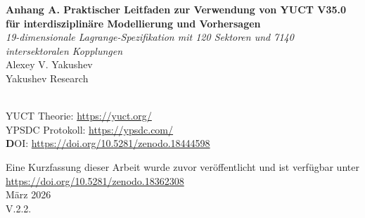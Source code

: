 \documentclass[13pt,a4paper]{article}
\begin{document}
	
	\begin{titlepage}
		\begin{center}
			\vspace*{0.2cm}
			{\Huge\textbf{Anhang A. 
					Praktischer Leitfaden zur Verwendung von YUCT V35.0\\[0.3cm]
					für interdisziplinäre Modellierung und Vorhersagen}}\\[0.8cm]
			
			{\Large\textit{19-dimensionale Lagrange-Spezifikation mit 120 Sektoren und 7140 intersektoralen Kopplungen}}\\[1.2cm]
			
			{\Large Alexey V. Yakushev}\\[0.3cm]
			{\large Yakushev Research}\\\
			
			YUCT Theorie: \url{https://yuct.org/}\\
			YPSDC Protokoll: \url{https://ypsdc.com/}\\
			
			
			\vspace{2cm}
			\textbf DOI: \url{https://doi.org/10.5281/zenodo.18444598}\\
			
			\vspace{1cm}
			
			\vspace{0cm}
			\large 
			Eine Kurzfassung dieser Arbeit wurde zuvor veröffentlicht und ist verfügbar unter\\ \url{https://doi.org/10.5281/zenodo.18362308}\\
			\vspace{1cm}
			März 2026 \\ \large V.2.2.
			

\end{center}
\end{titlepage}
\end{document}
